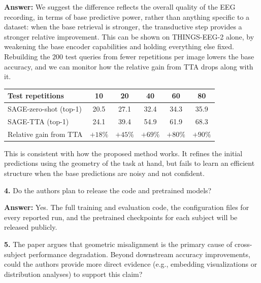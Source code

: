\documentclass[11pt]{article}
\newcommand{\answer}[1]{{\textbf{Answer:} \color{blue} #1}}
\begin{document}
\answer{
We suggest the difference reflects the overall quality of the EEG recording, in terms of base predictive power, rather than anything specific to a dataset: when the base retrieval is stronger, the transductive step provides a stronger relative improvement. This can be shown on THINGS-EEG-2 alone, by weakening the base encoder capabilities and holding everything else fixed. Rebuilding the $200$ test queries from fewer repetitions per image lowers the base accuracy, and we can monitor how the relative gain from TTA drops along with it.

\begin{center}
\begin{tabular}{lccccc}
\hline
Test repetitions & 10 & 20 & 40 & 60 & 80 \\
\hline
SAGE-zero-shot (top-1) & 20.5 & 27.1 & 32.4 & 34.3 & 35.9 \\
SAGE-TTA (top-1)       & 24.1 & 39.4 & 54.9 & 61.9 & 68.3 \\
Relative gain from TTA & $+18\%$ & $+45\%$ & $+69\%$ & $+80\%$ & $+90\%$ \\
\hline
\end{tabular}
\end{center}

This is consistent with how the proposed method works. It refines the initial predictions using the geometry of the task at hand, but fails to learn an efficient structure when the base predictions are noisy and not confident.
}

\textbf{4.} Do the authors plan to release the code and pretrained models?

\answer{
Yes. The full training and evaluation code, the configuration files for every reported run, and the pretrained checkpoints for each subject will be released publicly.
}

\textbf{5.} The paper argues that geometric misalignment is the primary cause of cross-subject
performance degradation. Beyond downstream accuracy improvements, could the authors provide more
direct evidence (e.g., embedding visualizations or distribution analyses) to support this claim?
\end{document}
